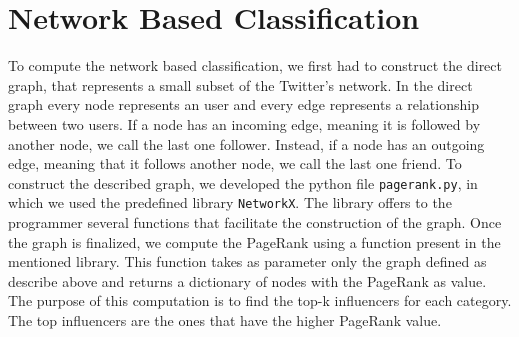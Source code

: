 \documentclass[journal,11pt]{vgtc}
\begin{document}
\section{Network Based Classification}
To compute the network based classification, we first had to construct the direct graph, that represents a small 
subset of the Twitter's network. 
In the direct graph every node represents an user and every edge represents a relationship between two users.
If a node has an incoming edge, meaning it is followed by another node, we call the last one follower. Instead, if a node has an 
outgoing edge, meaning that it follows another node, we call the last one friend.
To construct the described graph, we developed the python file \texttt{pagerank.py}, in which we used the predefined library \texttt{NetworkX}. The library offers to the programmer 
several functions that facilitate the construction of the graph. 
Once the graph is finalized, we compute the PageRank using a function present in the mentioned library. 
This function takes as parameter only the graph defined as describe above and returns a dictionary of nodes 
with the PageRank as value. 
The purpose of this computation is to find the top-k influencers for each category. The top influencers
are the ones that have the higher PageRank value.



\end{document}
